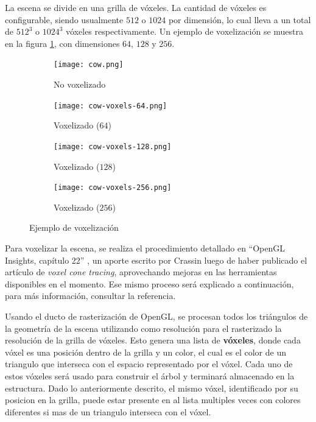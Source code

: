 La escena se divide en una grilla de vóxeles.
La cantidad de vóxeles es configurable, siendo usualmente $512$ o $1024$ por dimensión, lo cual lleva a un total de $512^3$ o $1024^3$ vóxeles respectivamente.
Un ejemplo de voxelización se muestra en la figura \ref{fig:voxelized-cow}, con dimensiones $64$, $128$ y $256$.

\begin{figure}[ht]
    \begin{subfigure}{.24\textwidth}
        \centering
        \texttt{[image: cow.png]}
        \caption{No voxelizado}
    \end{subfigure}
    \begin{subfigure}{.24\textwidth}
        \centering
        \texttt{[image: cow-voxels-64.png]}
        \caption{Voxelizado ($64$)}
    \end{subfigure}
    \begin{subfigure}{.24\textwidth}
        \centering
        \texttt{[image: cow-voxels-128.png]}
        \caption{Voxelizado ($128$)}
    \end{subfigure}
    \begin{subfigure}{.24\textwidth}
        \centering
        \texttt{[image: cow-voxels-256.png]}
        \caption{Voxelizado ($256$)}
    \end{subfigure}
    \caption{Ejemplo de voxelización}
    \label{fig:voxelized-cow}
\end{figure}

Para voxelizar la escena, se realiza el procedimiento detallado en ``OpenGL Insights, capítulo 22'' \cite{opengl-insights}, un aporte escrito por Crassin luego de haber publicado el artículo de \textit{voxel cone tracing}, aprovechando mejoras en las herramientas disponibles en el momento.
Ese mismo proceso será explicado a continuación, para más información, consultar la referencia.

Usando el ducto de rasterización de OpenGL, se procesan todos los triángulos de la geometría de la escena utilizando como resolución para el rasterizado la resolución de la grilla de vóxeles.
Esto genera una lista de \textbf{vóxeles}, donde cada vóxel es una posición dentro de la grilla y un color, el cual es el color de un triangulo que interseca con el espacio representado por el vóxel.
Cada uno de estos vóxeles será usado para construir el árbol y terminará almacenado en la estructura. Dado lo anteriormente descrito, el mismo vóxel, identificado por su posicion en la grilla, puede estar presente en al lista multiples veces con colores diferentes si mas de un triangulo interseca con el vóxel. 


